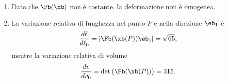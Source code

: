 \begin{exercise}
\begin{svolgimento}
\begin{enumerate}
			\begin{equation}
				[\Fb(\xb)]=\left[\begin{matrix}
					1+\frac{6x_1}{L}&0&0\\
					0&1+\frac{2x_3^2}{L^2}&\frac{4x_2x_3}{L^2}\\
					\frac{x_3^2}{L^2}&0&1+\frac{2x_1x_3}{L^2}
				\end{matrix}\right].
			\end{equation}
			Valutando $\Fb$ nel punto $P$, si ha
			\begin{equation}
				\Fb(\xb(P))=7\eb_1\otimes\eb_1+9\eb_2\otimes\eb_2+4\eb_3\otimes\eb_1+5\eb_3\otimes\eb_3.
			\end{equation}
			Analogamente si procede per $\Hb(\xb)$, ovvero, una volta calcolata $\Fb(\xb)$, basta ricordare che $\Hb=\Fb-\Ib$:
			\begin{equation}
				\Hb( \xb)=\left(\frac{6x_1}{L}\right)\eb_1\otimes\eb_1+\frac{x_3^2}{L^2}\eb_3\otimes\eb_1+\left(\frac{2x_3^2}{L^2}\right)\eb_2\otimes\eb_2+\frac{4x_2x_3}{L^2}\eb_2\otimes\eb_3+\left(\frac{2x_1x_3}{L^2}\right)\eb_3\otimes\eb_3.
			\end{equation}
			Infine, si determina il tensore destro di Cauchy--Green:
			\begin{equation}
				\Cb(\xb(P))=65\eb_1\otimes\eb_1+20(\eb_1\otimes\eb_3+\eb_3\otimes\eb_2)+81\eb_2\otimes\eb_2+25\eb_3\otimes\eb_3
			\end{equation}
			e il tensore di Green--Saint-Venant:
			\begin{equation}
				\Db(\xb(P))=\frac12(\Cb(\xb(P))-\Ib)=\Big( 32\eb_1\otimes\eb_1+10(\eb_1\otimes\eb_3+\eb_3\otimes\eb_2)+40\eb_2\otimes\eb_2+12\eb_3\otimes\eb_3 \Big).
			\end{equation}
			\item Dato che $\Fb(\xb)$ non è costante, la deformazione non è omogenea.
			\item La variazione relativa di lunghezza nel punto $P$ e nella direzione $\eb_1$ è
			\begin{equation}
				\frac{d\ell}{d\ell_0}=|\Fb(\xb(P))\eb_1|=\sqrt{65},
			\end{equation}
			mentre la variazione relativa di volume
			\begin{equation}
				\frac{dv}{dv_0}=\det\big(\Fb(\xb(P))\big)=315.
			\end{equation}
		\end{enumerate}
	\end{svolgimento}
\end{exercise}

